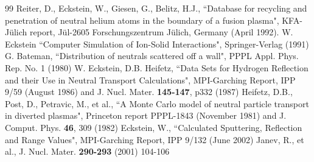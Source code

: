 \begin{thebibliography}{99}
 Reiter, D., Eckstein, W., Giesen, G., Belitz,
                    H.J.,
                    ``Database for recycling and penetration of neutral
                    helium atoms in the boundary of a fusion plasma", KFA-J\"ulich report,
                    J\"ul-2605
                    Forschungszentrum J\"ulich, Germany (April 1992).
 W. Eckstein ``Computer Simulation of Ion-Solid
                     Interactions", Springer-Verlag (1991)
 G. Bateman, ``Distribution of neutrals scattered off a wall",
                     PPPL Appl. Phys. Rep. No. 1 (1980)
 W. Eckstein, D.B. Heifetz, ``Data Sets for Hydrogen Reflection and their
                      Use in Neutral Transport Calculations",
                      MPI-Garching Report, IPP 9/59 (August 1986) and J. Nucl. Mater. \textbf{145-147}, p332
                      (1987)
 Heifetz, D.B., Post, D., Petravic, M.,
                     et al., ``A Monte Carlo model of neutral particle transport
                    in diverted plasmas",
                    Princeton report PPPL-1843 (November 1981) and
                     J. Comput. Phys. \textbf{46}, 309 (1982)
 Eckstein, W., ``Calculated Sputtering,
                     Reflection and Range Values",
                     MPI-Garching Report, IPP 9/132 (June 2002)
 Janev, R., et al., J. Nucl. Mater. \textbf{290-293} (2001) 104-106                   
\end{thebibliography}
